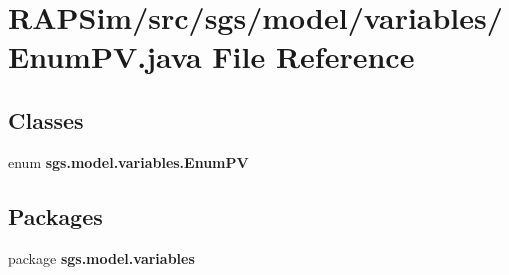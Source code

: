 \section{R\-A\-P\-Sim/src/sgs/model/variables/\-Enum\-P\-V.java File Reference}
\label{_enum_p_v_8java}
\subsection*{Classes}
\begin{DoxyCompactItemize}
\item 
enum {\bf sgs.\-model.\-variables.\-Enum\-P\-V}
\end{DoxyCompactItemize}
\subsection*{Packages}
\begin{DoxyCompactItemize}
\item 
package {\bf sgs.\-model.\-variables}
\end{DoxyCompactItemize}
